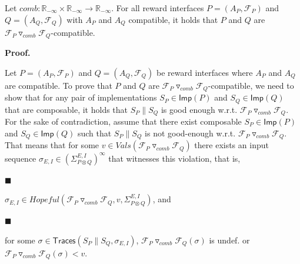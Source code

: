 Let $\mathit{comb}:\mathbb{R}_{-\infty}\times\mathbb{R}_{-\infty}\to\mathbb{R}_{-\infty}$. For all reward interfaces $P=(A_{P},\mathcal{F}_{P})$ and $Q=(A_{Q},\mathcal{F}_{Q})$ with $A_{P}$ and $A_{Q}$ compatible, it holds that $P$ and $Q$ are ${{\mathcal{F}_{P}}\mathbin{\triangledown_{\mathit{comb}}}{\mathcal{F}_{Q}}}$-compatible.\par
 
 
 
 
 
\par\medskip\noindent\textbf{Proof.}\par
 
 
Let $P=(A_{P},\mathcal{F}_{P})$ and $Q=(A_{Q},\mathcal{F}_{Q})$ be reward interfaces where $A_{P}$ and $A_{Q}$ are compatible. To prove that $P$ and $Q$ are ${{\mathcal{F}_{P}}\mathbin{\triangledown_{\mathit{comb}}}{\mathcal{F}_{Q}}}$-compatible, we need to show that for any pair of implementations $S_{P}\in\mathsf{Imp}(P)$ and $S_{Q}\in\mathsf{Imp}(Q)$ that are composable, it holds that $S_{P}\parallel S_{Q}$ is good enough w.r.t. ${{\mathcal{F}_{P}}\mathbin{\triangledown_{\mathit{comb}}}{\mathcal{F}_{Q}}}$. For the sake of contradiction, assume that there exist composable $S_{P}\in\mathsf{Imp}(P)$ and $S_{Q}\in\mathsf{Imp}(Q)$ such that $S_{P}\parallel S_{Q}$ is not good-enough w.r.t. ${{\mathcal{F}_{P}}\mathbin{\triangledown_{\mathit{comb}}}{\mathcal{F}_{Q}}}$. That means that for some $v\in\mathit{Vals}({{\mathcal{F}_{P}}\mathbin{\triangledown_{\mathit{comb}}}{\mathcal{F}_{Q}}})$ there exists an input sequence $\sigma_{E,I}\in(\Sigma_{P\otimes Q}^{E,I})^{\infty}$ that witnesses this violation, that is,\par
  
\par\noindent  $\blacksquare$ 
 
$\sigma_{E,I}\in\mathit{Hopeful}({{\mathcal{F}_{P}}\mathbin{\triangledown_{\mathit{comb}}}{\mathcal{F}_{Q}}},v,\Sigma_{P\otimes Q}^{E,I})$, and\par
 
 
 
\par\noindent  $\blacksquare$ 
 
for some $\sigma\in\mathsf{Traces}(S_{P}\parallel S_{Q},\sigma_{E,I})$, ${{\mathcal{F}_{P}}\mathbin{\triangledown_{\mathit{comb}}}{\mathcal{F}_{Q}}}(\sigma)$ is undef. or ${{\mathcal{F}_{P}}\mathbin{\triangledown_{\mathit{comb}}}{\mathcal{F}_{Q}}}(\sigma)<v$.\par
 
